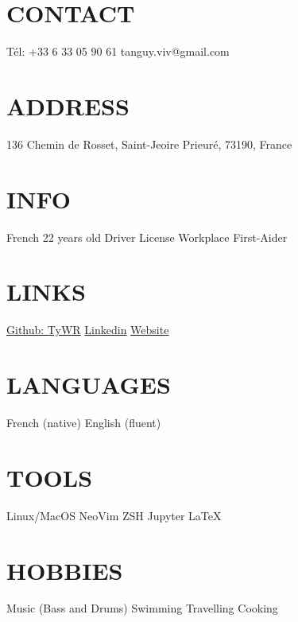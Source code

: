 \documentclass[]{cv-style}
\begin{document}
%
\begin{aside}
%
\section{CONTACT} \vspace{0.1cm}
Tél: +33 6 33 05 90 61
tanguy.viv@gmail.com
%
\section{ADDRESS} \vspace{0.1cm}
136 Chemin de Rosset,
Saint-Jeoire Prieuré,
73190,
France
%
\section{INFO} \vspace{0.1cm}
French
22 years old
Driver License
Workplace First-Aider
%
\section{LINKS} \vspace{0.1cm}
\href{https://github.com/TyWR}{Github: TyWR}
\href{https://www.linkedin.com/in/tanguy-vivier/}{Linkedin}
\href{https://tywr.github.io/}{Website}
%
\section{LANGUAGES} \vspace{0.1cm}
French (native)
English (fluent)
%
\section{TOOLS} \vspace{0.1cm}
Linux/MacOS
NeoVim
ZSH
Jupyter
\LaTeX{}
%
\section{HOBBIES} \vspace{0.1cm}
Music
(Bass and Drums)
Swimming
Travelling
Cooking
%
\end{aside}
\vspace{0.15cm}
\end{document}

